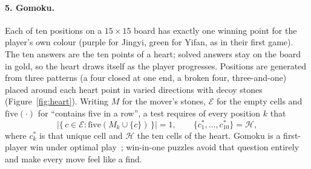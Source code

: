 \documentclass[sigconf,nonacm]{acmart}
\begin{document}
\paragraph{5. Gomoku.} Each of ten positions on a $15\times15$ board has exactly one winning point
for the player's own colour (purple for Jingyi, green for Yifan, as in their first game). The ten
answers are the ten points of a heart; solved answers stay on the board in gold, so the heart draws
itself as the player progresses. Positions are generated from three patterns (a four closed at one
end, a broken four, three-and-one) placed around each heart point in varied directions with decoy
stones (Figure~\ref{fig:heart}). Writing $M$ for the mover's stones, $\mathcal{E}$ for the empty
cells and $\mathrm{five}(\cdot)$ for ``contains five in a row'', a test requires of every position
$k$ that
\begin{equation}\label{eq:win}
  \big|\{\, c \in \mathcal{E} : \mathrm{five}(M_k \cup \{c\}) \,\}\big| = 1, \qquad
  \{c^{\ast}_1, \dots, c^{\ast}_{10}\} = \mathcal{H},
\end{equation}
where $c^{\ast}_k$ is that unique cell and $\mathcal{H}$ the ten cells of the heart. Gomoku is a
first-player win under optimal play~\cite{allis1994searching}; win-in-one puzzles avoid that
question entirely and make every move feel like a find.
\end{document}
